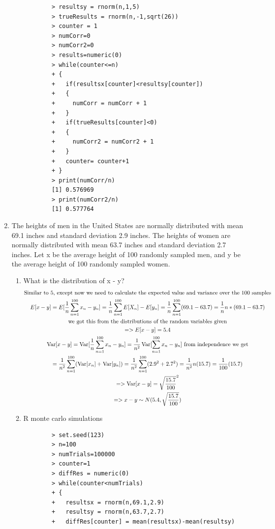 \documentclass[11pt]{article}
\newcommand{\Var}{\mathop{\rm Var}}
\begin{document}
\begin{enumerate}
\begin{enumerate}
\begin{verbatim}
		> resultsy = rnorm(n,1,5)
		> trueResults = rnorm(n,-1,sqrt(26))
		> counter = 1
		> numCorr=0
		> numCorr2=0
		> results=numeric(0) 
		> while(counter<=n)
		+ {
		+   if(resultsx[counter]<resultsy[counter])
		+   {
		+     numCorr = numCorr + 1
		+   }
		+   if(trueResults[counter]<0)
		+   {
		+     numCorr2 = numCorr2 + 1
		+   }
		+   counter= counter+1
		+ }
		> print(numCorr/n)
		[1] 0.576969
		> print(numCorr2/n)
		[1] 0.577764
	\end{verbatim}
\end{enumerate}
\item The heights of men in the United States are normally distributed with mean 69.1 inches and standard deviation
2.9 inches. The heights of women are normally distributed with mean 63.7 inches and standard deviation 2.7 inches. Let x be the average height of 100 randomly sampled men, and y be the average height
of 100 randomly sampled women.
\begin{enumerate}
	\item What is the distribution of x - y?
	\begin{gather}
		\text{Similar to 5, except now we need to calculate the expected value and variance over the 100 samples}\\
		E[x-y] = E[\frac{1}{n}\sum_{n=1}^{100} x_n-y_n] =\frac{1}{n}\sum_{n=1}^{100} E[X_n] - E[y_n] =\frac{1}{n}\sum_{n=1}^{100} (69.1-63.7) = \frac{1}{n} n*(69.1-63.7) \\
		\text{we got this from the distributions of the random variables given}\\
		=> E[x-y] = 5.4\\
		\Var[x-y] = \Var[\frac{1}{n}\sum_{n=1}^{100} x_n-y_n] =\frac{1}{n^2}\Var[\sum_{n=1}^{100} x_n-y_n] \text{ from independence we get}\\
		= \frac{1}{n^2}\sum_{n=1}^{100} (\Var[x_n]+\Var[y_n]) = \frac{1}{n^2}\sum_{n=1}^{100} (2.9^2+2.7^2) = \frac{1}{n^2}n (15.7) = \frac{1}{100}(15.7) \\
		=> \Var[x-y] = \sqrt{\frac{15.7}{100}}^2\\
		=>
		x-y \sim N(5.4,\sqrt{\frac{15.7}{100}})
	\end{gather}
	\item R monte carlo simulations 
	\begin{verbatim}
		> set.seed(123)
		> n=100
		> numTrials=100000
		> counter=1
		> diffRes = numeric(0)
		> while(counter<numTrials)
		+ {
		+   resultsx = rnorm(n,69.1,2.9)
		+   resultsy = rnorm(n,63.7,2.7)
		+   diffRes[counter] = mean(resultsx)-mean(resultsy)

\end{verbatim}
\end{enumerate}
\end{enumerate}
\end{document}
